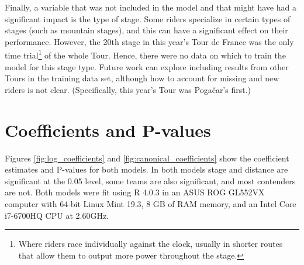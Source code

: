 \documentclass[aos,preprint]{imsart}
\begin{document}
Finally, a variable that was not included in the model and that might have had a significant impact is the type of stage. Some riders specialize in certain types of stages (such as mountain stages), and this can have a significant effect on their performance. However, the 20th stage in this year's Tour de France was the only time trial\footnote{Where riders race individually against the clock, usually in shorter routes that allow them to output more power throughout the stage.} of the whole Tour. Hence, there were no data on which to train the model for this stage type. Future work can explore including results from other Tours in the training data set, although how to account for missing and new riders is not clear. (Specifically, this year's Tour was Pogačar's first.) \\



\FloatBarrier
\clearpage
\small



\clearpage
\appendix

\section{Coefficients and P-values}


Figures \ref{fig:log_coefficients} and \ref{fig:canonical_coefficients} show the coefficient estimates and P-values for both models. In both models stage and distance are significant at the 0.05 level, some teams are also significant, and most contenders are not. Both models were fit using \textsf{R} 4.0.3 \citep{R} in an ASUS ROG GL552VX computer with 64-bit Linux Mint 19.3, 8 GB of RAM memory, and an Intel Core i7-6700HQ CPU at 2.60GHz.
\end{document}
